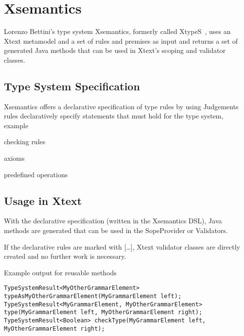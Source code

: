 \section{Xsemantics}
\label{sec:xsemantics}

Lorenzo Bettini's type system Xsemantics, formerly called XtypeS~\cite{Bet11},
uses an Xtext metamodel and a set of rules and premises as input and returns a set of generated Java methods that can be used in Xtext's scoping and validator classes.
\subsection{Type System Specification}
Xsemantics offers a declarative specification of type rules by using
Judgements
rules declaratively specify statements that must hold for the type system, example

checking rules

axioms

predefined operations

\subsection{Usage in Xtext}

With the declarative specification (written in the Xsemantics DSL), Java methods are generated that can be used in the SopeProvider or Validators. 

If the declarative rules are marked with […], Xtext validator classes are directly created and no further work is necessary.

Example output for reusable methods

\begin{lstlisting}
TypeSystemResult<MyOtherGrammarElement> typeAsMyOtherGrammarElement(MyGrammarElement left); 
TypeSystemResult<MyGrammarElement, MyOtherGrammarElement> type(MyGrammarElement left, MyOtherGrammarElement right); 
TypeSystemResult<Boolean> checkType(MyGrammarElement left, MyOtherGrammarElement right); 
\end{lstlisting}
